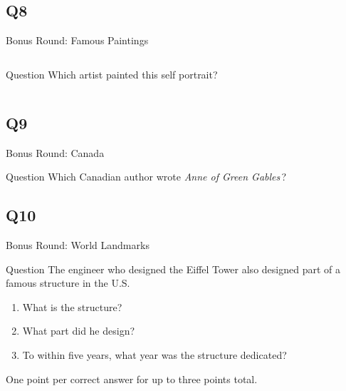 \documentclass[11pt]{beamer}
\begin{document}
\subsection*{Q8}
\begin{frame}[t]{Bonus Round: Famous Paintings}
\vspace{0.5em}
\begin{columns}[T,totalwidth=\linewidth]
\begin{column}{0.25\linewidth}
\begin{block}{Question}
Which artist painted this self portrait?
\end{block}
\end{column}
\begin{column}{0.7\linewidth}
\begin{center}
\texttt{[image: \{Images/michelangelo]}.jpg}
\end{center}
\end{column}
\end{columns}
\end{frame}
    

\subsection*{Q9}
\begin{frame}[t]{Bonus Round: Canada}
\vspace{0.5em}
\begin{block}{Question}
Which Canadian author wrote \emph{Anne of Green Gables}\,?
\end{block}
\end{frame}
    

\subsection*{Q10}
\begin{frame}[t]{Bonus Round: World Landmarks}
\vspace{0.5em}
\begin{block}{Question}
The engineer who designed the Eiffel Tower also designed part of a famous structure in the U.S. 
\begin{enumerate}
\item What is the structure?
\item What part did he design?
\item To within five years, what year was the structure dedicated?
\end{enumerate}
One point per correct answer for up to three points total.
\end{block}
\end{frame}
    
\end{document}
